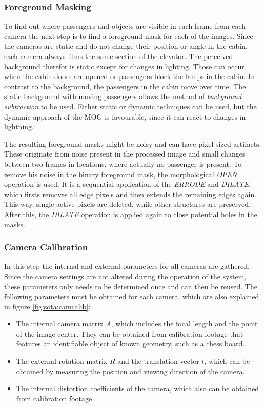 \subsubsection{Foreground Masking}
To find out where passengers and objects are visible in each frame from each camera the next step is to find a foreground mask for each of the images.
Since the cameras are static and do not change their position or angle in the cabin,
each camera always films the same section of the elevator.
The perceived background therefor is static except for changes in lighting.
Those can occur when the cabin doors are opened or passengers block the lamps in the cabin.
In contrast to the background, the passengers in the cabin move over time.
The static background with moving passengers allows the method of \emph{background subtraction} to be used.
Either static or dynamic techniques can be used, 
but the dynamic approach of the \ac{MOG} is favourable, 
since it can react to changes in lightning.

The resulting foreground masks might be noisy and can have pixel-sized artifacts.
These originate from noise present in the processed image and small changes between two frames in locations, where actually no passenger is present. 
To remove his noise in the binary foreground mask, the morphological \emph{OPEN} operation is used. 
It is a sequential application of the \emph{ERRODE} and \emph{DILATE}, which firsts removes all edge pixels and then extends the remaining edges again.
This way, single active pixels are deleted, while other structures are preserved.
After this, the \emph{DILATE} operation is applied again to close potential holes in the masks.

\subsubsection{Camera Calibration}
In this step the internal and external parameters for all cameras are gathered.
Since the camera settings are not altered during the operation of the system, these parameters only needs to be determined once and can then be reused.
The following parameters must be obtained for each camera, which are also explained in figure \ref{fig:sota:camcalib}:
\begin{itemize}
    \item The internal camera matrix $ A $, which includes the focal length and the point of the image center. They can be obtained from calibration footage that features an identifiable object of known geometry, such as a chess board.
    \item The external rotation matrix $ R $ and the translation vector $ t $, which can be obtained by measuring the position and viewing direction of the camera.
    \item The internal distortion coefficients of the camera, which also can be obtained from calibration footage.
\end{itemize}

